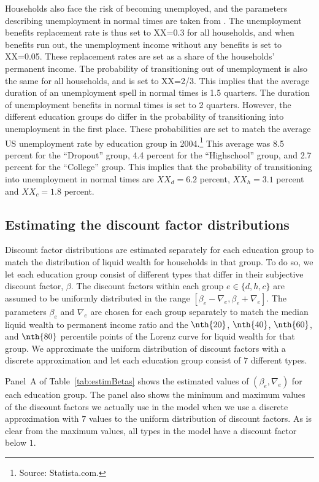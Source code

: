 \documentclass[../HAFiscal]{subfiles}
\begin{document}
Households also face the risk of becoming unemployed, and the parameters describing unemployment in normal times are taken from \citet{carroll2020modeling}. The unemployment benefits replacement rate is thus set to XX=0.3 for all households, and when benefits run out, the unemployment income without any benefits is set to XX=0.05. These replacement rates are set as a share of the households' permanent income. The probability of transitioning out of unemployment is also the same for all households, and is set to XX=2/3. This implies that the average duration of an unemployment spell in normal times is 1.5 quarters. The duration of unemployment benefits in normal times is set to 2 quarters. However, the different education groups do differ in the probability of transitioning into unemployment in the first place. These probabilities are set to match the average US unemployment rate by education group in 2004.\footnote{Source: Statista.com.} This average was 8.5 percent for the ``Dropout'' group, 4.4 percent for the ``Highschool'' group, and 2.7 percent for the ``College'' group. This implies that the probability of transitioning into unemployment in normal times are $XX_d=6.2$ percent, $XX_h=3.1$ percent and $XX_c=1.8$ percent. 

\subsection{Estimating the discount factor distributions} 
\label{sec:estimBetas}

Discount factor distributions are estimated separately for each education group to match the distribution of liquid wealth for households in that group. To do so, we let each education group consist of different types that differ in their subjective discount factor, $\beta$. The discount factors within each group $e\in \{d, h, c\}$ are assumed to be uniformly distributed in the range $[\beta_e-\nabla_e, \beta_e+\nabla_e]$. The parameters $\beta_e$ and $\nabla_e$ are chosen for each group separately to match the median liquid wealth to permanent income ratio and the $\nth{20}$, $\nth{40}$, $\nth{60}$, and $\nth{80}$ percentile points of the Lorenz curve for liquid wealth for that group. We approximate the uniform distribution of discount factors with a discrete approximation and let each education group consist of $7$ different types.

Panel~A of Table~\ref{tab:estimBetas} shows the estimated values of $(\beta_e, \nabla_e)$ for each education group. The panel also shows the minimum and maximum values of the discount factors we actually use in the model when we use a discrete approximation with $7$ values to the uniform distribution of discount factors. As is clear from the maximum values, all types in the model have a discount factor below $1$. 
\end{document}
